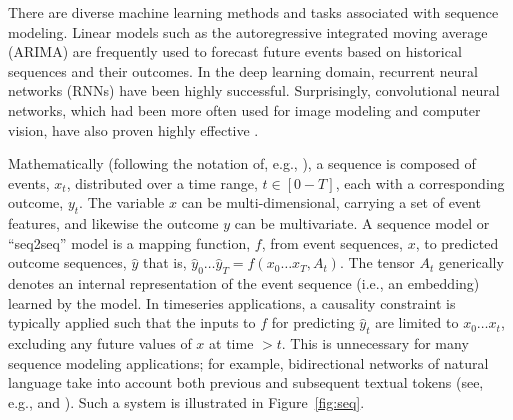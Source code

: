 \documentclass[nonacm,12pt]{acmart}
\begin{document}
There are diverse machine learning methods and tasks associated with sequence modeling. Linear models such as the autoregressive integrated moving average (ARIMA) are frequently used to forecast future events based on historical sequences and their outcomes. In the deep learning domain, recurrent neural networks (RNNs) have been highly successful.  Surprisingly, convolutional neural networks, which had been more often used for image modeling and computer vision, have also proven highly effective \cite{bai_empirical_2018}.

Mathematically (following the notation of, e.g., \citealt{bai_empirical_2018}), a sequence is composed of events, $x_t$, distributed over a time range, $t \in [0-T]$, each with a corresponding outcome, $y_t$. 
The variable $x$ can be multi-dimensional, carrying a set of event features, and likewise the outcome $y$ can be multivariate. 
A sequence model or ``seq2seq'' model is a mapping function, $f$, from event sequences, $x$, to predicted outcome sequences, $\hat{y}$ that is, $\hat{y}_0 \ldots \hat{y}_T = f(x_0 \ldots x_T, A_t)$.  
The tensor $A_t$ generically denotes an internal representation of the event sequence (i.e., an embedding) learned by the model.
In timeseries applications, a causality constraint is typically applied such that the inputs to $f$ for predicting $\hat{y}_t$ are limited to $x_0 \ldots x_t$, excluding any future values of $x$ at time $>t$. 
This is unnecessary for many sequence modeling applications; for example, bidirectional networks of natural language take into account both previous and subsequent textual tokens (see, e.g., \citealt{huang_bidirectional_2015} and \citealt{devlin_bert_2018}).
Such a system is illustrated in Figure~\ref{fig:seq}.
\end{document}
